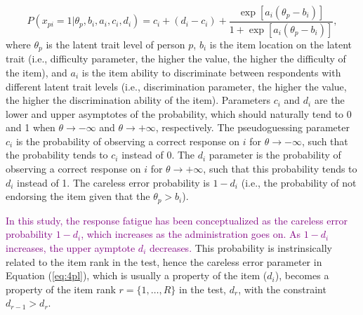 \documentclass{svproc}
\newcommand{\ottavia}[1]{\textcolor{purple}{#1}}
\begin{document}
\begin{equation}\label{eq:4pl}
	P(x_{pi}= 1| \theta_p, b_i, a_i, c_i, d_i) = c_i + (d_i -c_i) + \dfrac{\exp[a_i(\theta_p - b_i)]}{1 + \exp[a_i(\theta_p - b_i)]},
\end{equation}
where $\theta_p$ is the latent trait level of person $p$, $b_i$ is the item location on the latent trait (i.e., difficulty parameter, the higher the value, the higher the difficulty of the item), and $a_i$ is the item ability to discriminate between respondents with different latent trait levels (i.e., discrimination parameter, the higher the value, the higher the discrimination ability of the item). Parameters $c_i$ and $d_i$ are the lower and upper asymptotes of the probability, which should naturally tend to 0 and 1 when $\theta \to - \infty$ and $\theta \to +\infty$, respectively. 
The pseudoguessing parameter $c_i$ is the probability of observing a correct response on $i$ for $\theta \to - \infty$, such that the probability tends to $c_i$ instead of 0. 
The $d_i$ parameter is the probability of observing a correct response on $i$ for $\theta \to + \infty$, such that this probability tends to $d_i$ instead of 1. The careless error probability is $1 - d_i$ (i.e., the probability of not endorsing the item given that the $\theta_p > b_i$).


\ottavia{In this study, the response fatigue has been conceptualized as the careless error probability $1 - d_i$, which increases as the administration goes on. As $1 - d_i$ increases, the upper aymptote $d_i$ decreases.}
This probability is instrinsically related to the item rank in the test, hence the careless error parameter in Equation (\ref{eq:4pl}), which is usually a property of the item ($d_i$), becomes a property of the item rank $r = \{1, \ldots, R\}$ in the test, $d_r$, with the constraint $d_{r-1} > d_r$.
\normalcolor
\end{document}

